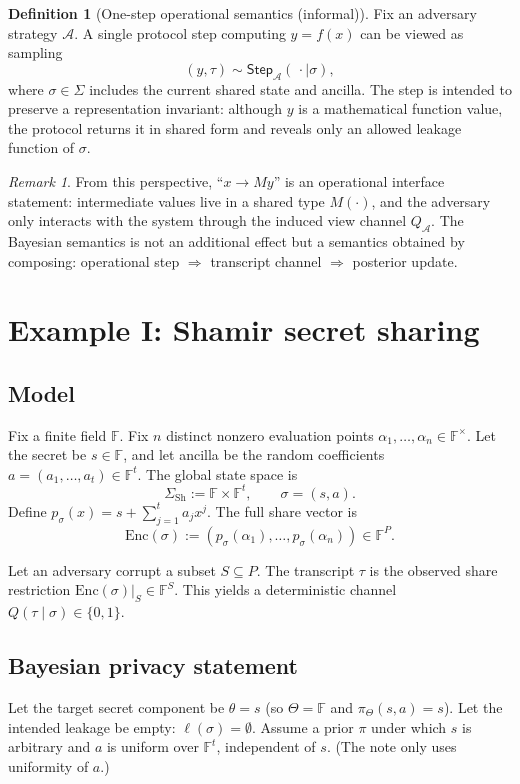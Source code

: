 \documentclass[11pt,a4paper]{article}
\theoremstyle{definition}
\newtheorem{definition}[theorem]{Definition}
\theoremstyle{remark}
\newtheorem{remark}[theorem]{Remark}
\newcommand{\F}{\mathbb{F}}
\newcommand{\Parties}{P}
\newcommand{\Leak}{\ell}
\newcommand{\Enc}{\mathrm{Enc}}
\newcommand{\post}{\pi}
\begin{document}
\begin{definition}[One-step operational semantics (informal)]
\label{def:step}
Fix an adversary strategy \(\mathcal{A}\). A single protocol step computing \(y=f(x)\) can be viewed as sampling
\[
(y,\tau) \sim \mathsf{Step}_{\mathcal{A}}(\,\cdot\mid \sigma),
\]
where \(\sigma\in\Sigma\) includes the current shared state and ancilla. The step is intended to preserve a representation invariant: although \(y\) is a mathematical function value, the protocol returns it in shared form and reveals only an allowed leakage function of \(\sigma\).
\end{definition}

\begin{remark}
From this perspective, ``\(x\to M y\)'' is an operational interface statement: intermediate values live in a shared type \(M(\cdot)\), and the adversary only interacts with the system through the induced view channel \(Q_{\mathcal{A}}\). The Bayesian semantics is not an additional effect but a semantics obtained by composing: operational step \(\Rightarrow\) transcript channel \(\Rightarrow\) posterior update.
\end{remark}

\section{Example I: Shamir secret sharing}
\label{sec:bayes-shamir}

\subsection{Model}
Fix a finite field \(\F\). Fix \(n\) distinct nonzero evaluation points \(\alpha_1,\dots,\alpha_n\in\F^\times\).
Let the secret be \(s\in\F\), and let ancilla be the random coefficients \(a=(a_1,\dots,a_t)\in\F^t\). The global state space is
\[
\Sigma_{\mathrm{Sh}} := \F \times \F^t,
\qquad
\sigma=(s,a).
\]
Define \(p_\sigma(x)=s+\sum_{j=1}^t a_j x^j\). The full share vector is
\[
\Enc(\sigma) := (p_\sigma(\alpha_1),\dots,p_\sigma(\alpha_n))\in\F^{\Parties}.
\]

Let an adversary corrupt a subset \(S\subseteq \Parties\). The transcript \(\tau\) is the observed share restriction \(\Enc(\sigma)\vert_S\in \F^S\). This yields a deterministic channel \(Q(\tau\mid\sigma)\in\{0,1\}\).

\subsection{Bayesian privacy statement}
Let the target secret component be \(\theta=s\) (so \(\Theta=\F\) and \(\pi_\Theta(s,a)=s\)).
Let the intended leakage be empty: \(\Leak(\sigma)=\emptyset\).
Assume a prior \(\post\) under which \(s\) is arbitrary and \(a\) is uniform over \(\F^t\), independent of \(s\). (The note only uses uniformity of \(a\).)
\end{document}
